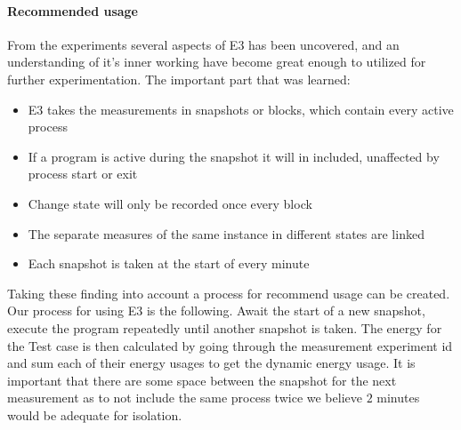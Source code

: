 \paragraph {Recommended usage}
From the experiments several aspects of E3 has been uncovered, and an understanding of it's inner working have become great enough to utilized for further experimentation. The important part that was learned:
\begin{itemize}
    \item E3 takes the measurements in snapshots or blocks, which contain every active process
    \item If a program is active during the snapshot it will in included, unaffected by process start or exit
    \item Change state will only be recorded once every block
    \item The separate measures of the same instance in different states are linked
    \item Each snapshot is taken at the start of every minute
\end{itemize} 
Taking these finding into account a process for recommend usage can be created. Our process for using E3 is the following.
Await the start of a new snapshot, execute the program repeatedly until another snapshot is taken. The energy for the Test case is then calculated by going through the measurement experiment id and sum each of their energy usages to get the dynamic energy usage. It is important that there are some space between the snapshot for the next measurement as to not include the same process twice we believe $2$ minutes would be adequate for isolation.